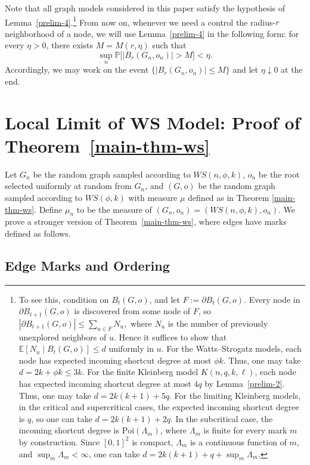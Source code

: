 \documentclass[10pt]{amsart}
\begin{document}
Note that all graph models considered in this paper satisfy the hypothesis of Lemma~\ref{prelim-4}.\footnote{To see this, condition on $B_t(G,o)$, and let $F:=\partial B_t(G,o)$. Every node in $\partial B_{t+1}(G,o)$ is discovered from some node of $F$, so $|\partial B_{t+1}(G,o)|\le \sum_{u\in F} N_u,$
where $N_u$ is the number of previously unexplored neighbors of $u$. Hence it suffices to show that $\mathbb E[N_u\mid B_t(G,o)]\le d$
uniformly in $u$. For the Watts--Strogatz models, each node has expected incoming shortcut degree at most $\phi k$. Thus, one may take $d=2k+\phi k\le 3k$. For the finite Kleinberg model $K(n,q,k,\ell)$, each node has expected incoming shortcut degree at most $4q$ by Lemma~\ref{prelim-2}. Thus, one may take $d=2k(k+1)+5q.$
For the limiting Kleinberg models, in the critical and supercritical cases, the expected incoming shortcut degree is $q$, so one can take $d=2k(k+1)+2q.$
In the subcritical case, the incoming shortcut degree is $\mathrm{Poi}(\Lambda_m)$, where $\Lambda_m$ is finite for every mark $m$ by construction. Since $[0,1]^2$ is compact, $\Lambda_m$ is a continuous function of $m$, and $\sup_m \Lambda_m<\infty$, one can take $d=2k(k+1)+q+\sup_m \Lambda_m.$} From now on, whenever we need a control the radius-$r$ neighborhood of a node, we will use Lemma~\ref{prelim-4} in the following form: for every $\eta>0$, there exists $M=M(r,\eta)$ such that
\[
\sup_n \mathbb P\big[|B_r(G_n,o_n)|>M\big]<\eta.
\]
Accordingly, we may work on the event $\{|B_r(G_n,o_n)|\le M\}$ and let $\eta\downarrow 0$ at the end. 

\section{Local Limit of WS Model: Proof of Theorem~\ref{main-thm-ws}} \label{sec:proof-WS}

Let $G_n$ be the random graph sampled according to $WS(n, \phi, k)$, $o_n$ be the root selected uniformly at random from $G_n$, and $(G, o)$ be the random graph sampled according to $WS(\phi, k)$ with measure $\mu$ defined as in Theorem \ref{main-thm-ws}. 
Define $\mu_n$ to be the measure of $(G_n, o_n) = (WS(n, \phi, k), o_n)$. 
We prove a stronger version of Theorem~\ref{main-thm-ws}, where edges have marks defined as follows.

\subsection{Edge Marks and Ordering} \label{edge-marks}
\end{document}
